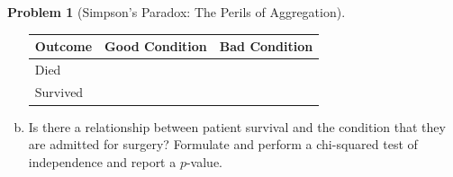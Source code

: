 \documentclass[10pt]{amsart}
\theoremstyle{definition}
\newtheorem{problem}[theorem]{Problem}
\newcommand{\1}[1]{\textbf{1}_{\left[#1\right]}} %
\begin{document}
\begin{problem}[Simpson's Paradox: The Perils of Aggregation]
\begin{enumerate}[(a)]
    \begin{center}
      \vspace{1em}
      \begin{tabular}{|l|c|c|}
        \hline
        \textbf{Outcome} & \textbf{Good Condition} & \textbf{Bad Condition} \\
        \hline
        Died     &    $\phantom{\displaystyle\int}$    &        \\
        \hline
        Survived &        &        $\phantom{\displaystyle\int}$\\ 
        \hline
      \end{tabular}
    \end{center}
    \item Is there a relationship between patient survival and the condition
    that they are admitted for surgery? Formulate and perform a chi-squared
    test of independence and report a $p$-value.
  \end{enumerate}
\end{problem}
\end{document}
